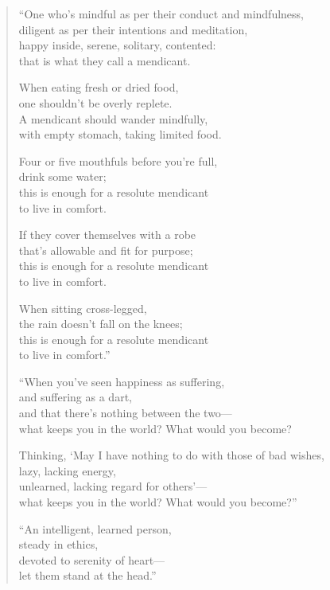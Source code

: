 \documentclass[12pt,openany]{book}%
\begin{document}
\begin{verse}%
“One who’s mindful as per their conduct and mindfulness, \\
diligent as per their intentions and meditation, \\
happy inside, serene, solitary, contented: \\
that is what they call a mendicant. 

When eating fresh or dried food, \\
one shouldn’t be overly replete. \\
A mendicant should wander mindfully, \\
with empty stomach, taking limited food. 

Four or five mouthfuls before you’re full, \\
drink some water; \\
this is enough for a resolute mendicant \\
to live in comfort. 

If they cover themselves with a robe \\
that’s allowable and fit for purpose; \\
this is enough for a resolute mendicant \\
to live in comfort. 

When sitting cross-legged, \\
the rain doesn’t fall on the knees; \\
this is enough for a resolute mendicant \\
to live in comfort.” 

“When you’ve seen happiness as suffering, \\
and suffering as a dart, \\
and that there’s nothing between the two—\\
what keeps you in the world? What would you become? 

Thinking, ‘May I have nothing to do with those of bad wishes, \\
lazy, lacking energy, \\
unlearned, lacking regard for others’—\\
what keeps you in the world? What would you become?” 

“An intelligent, learned person, \\
steady in ethics, \\
devoted to serenity of heart—\\
let them stand at the head.” 


\end{verse}
\end{document}
